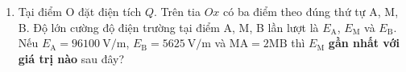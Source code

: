 \begin{enumerate}[label=\bfseries Câu \arabic*:]
\item Tại điểm O đặt điện tích $Q$. Trên tia $Ox$ có ba điểm theo đúng thứ tự A, M, B. Độ lớn cường độ điện trường tại điểm A, M, B lần lượt là $E_\text{A}$, $E_\text{M}$ và $E_\text{B}$. Nếu $E_\text{A}=\SI{96100}{\volt/\meter}$, $E_\text{B}=\SI{5625}{\volt/\meter}$ và $\text{MA}=2\text{MB}$ thì $E_\text{M}$ \textbf{gần nhất với giá trị nào} sau đây?
\end{enumerate}
